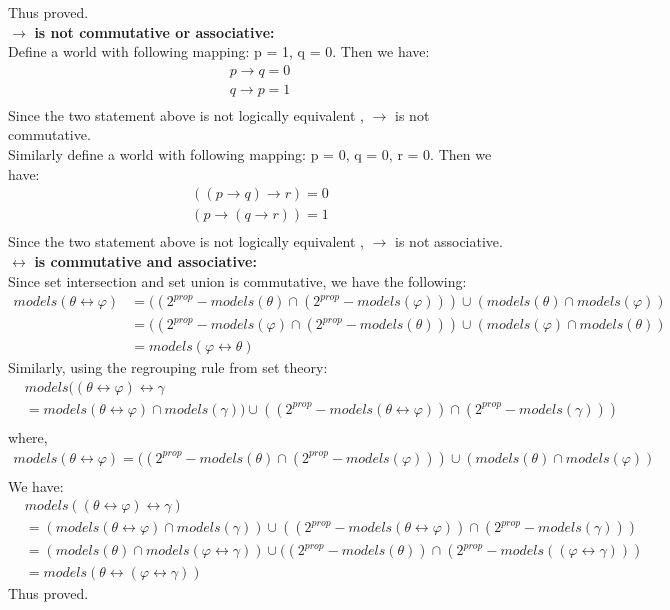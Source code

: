 \documentclass[12pt]{article}
\renewcommand{\phi}{\varphi}
\begin{document}
Thus proved.\\[10pt]
$\rightarrow$ \textbf{is not commutative or associative:} \\
Define a world with following mapping: p = 1, q = 0. Then we have: 
\begin{align*}
    p \rightarrow q = 0\\
    q \rightarrow p = 1\\
\end{align*}
Since the two statement above is not logically equivalent , $\rightarrow$ is not commutative.\\[3pt]
Similarly define a world with following mapping: p = 0, q = 0, r = 0. Then we have: 
\begin{align*}
    ((p \rightarrow q) \rightarrow r)= 0\\
    (p \rightarrow(q \rightarrow r)) = 1\\
\end{align*}
Since the two statement above is not logically equivalent , $\rightarrow$ is not associative.\\[20pt]
$\longleftrightarrow$ \textbf{is commutative and associative:} \\
Since set intersection and set union is commutative, we have the following:\\[5pt]
\begin{align*}
models(\theta \leftrightarrow \phi)
&= ((2^{prop} - models(\theta) \cap(2^{prop} - models(\phi))) \cup (models(\theta) \cap models(\phi))\\
& = ((2^{prop} - models(\phi) \cap(2^{prop} - models(\theta))) \cup (models(\phi) \cap models(\theta))\\
& = models(\phi \leftrightarrow \theta)
\end{align*}
Similarly, using the regrouping rule from set theory: 
\begin{align*}
&models((\theta \leftrightarrow \phi)\leftrightarrow \gamma \\
&=models( \theta \leftrightarrow \phi) \cap models(\gamma)) \cup ((2^{prop} - models (\theta \leftrightarrow \phi)) \cap (2^{prop} - models(\gamma)))\\
\end{align*}
where,
\begin{align*}
models(\theta \leftrightarrow \phi) = ((2^{prop} - models(\theta) \cap(2^{prop} - models(\phi))) \cup (models(\theta) \cap models(\phi))\\
\end{align*}
We have: 
\begin{align*}
&models((\theta \leftrightarrow \phi)\leftrightarrow \gamma) \\
& = (models( \theta \leftrightarrow \phi) \cap models(\gamma)) \cup ((2^{prop} - models (\theta \leftrightarrow \phi)) \cap (2^{prop} - models(\gamma)))\\
& = (models( \theta) \cap models(\phi \leftrightarrow \gamma)) \cup ((2^{prop} - models( \theta)) \cap (2^{prop} - models((\phi \leftrightarrow \gamma)))\\
& = models(\theta \leftrightarrow (\phi \leftrightarrow \gamma))
\end{align*}
Thus proved. 
\end{document}
